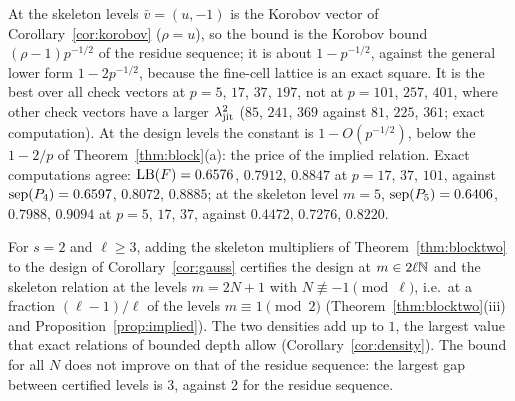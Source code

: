 At the skeleton levels $\bar v=(u,-1)$ is the Korobov vector of Corollary~\ref{cor:korobov} ($\rho=u$), so the bound is the Korobov bound $(\rho-1)p^{-1/2}$ of the residue sequence; it is about $1-p^{-1/2}$, against the general lower form $1-2p^{-1/2}$, because the fine-cell lattice is an exact square. It is the best over all check vectors at $p=5$, $17$, $37$, $197$, not at $p=101$, $257$, $401$, where other check vectors have a larger $\lambda_{\mathrm{jit}}^2$ ($85$, $241$, $369$ against $81$, $225$, $361$; exact computation). At the design levels the constant is $1-O(p^{-1/2})$, below the $1-2/p$ of Theorem~\ref{thm:block}(a): the price of the implied relation. Exact computations agree: $\mathrm{LB}(F)=0.6576$, $0.7912$, $0.8847$ at $p=17$, $37$, $101$, against $\operatorname{sep}(P_4)=0.6597$, $0.8072$, $0.8885$; at the skeleton level $m=5$, $\operatorname{sep}(P_5)=0.6406$, $0.7988$, $0.9094$ at $p=5$, $17$, $37$, against $0.4472$, $0.7276$, $0.8220$.

\begin{remark}\label{rem:gaussfrontier}
For $s=2$ and $\ell\ge3$, adding the skeleton multipliers of Theorem~\ref{thm:blocktwo} to the design of Corollary~\ref{cor:gauss} certifies the design at $m\in2\ell\mathbb{N}$ and the skeleton relation at the levels $m=2N+1$ with $N\not\equiv-1\pmod\ell$, i.e.\ at a fraction $(\ell-1)/\ell$ of the levels $m\equiv1\pmod2$ (Theorem~\ref{thm:blocktwo}(iii) and Proposition~\ref{prop:implied}). The two densities add up to $1$, the largest value that exact relations of bounded depth allow (Corollary~\ref{cor:density}). The bound for all $N$ does not improve on that of the residue sequence: the largest gap between certified levels is $3$, against $2$ for the residue sequence.
\end{remark}
